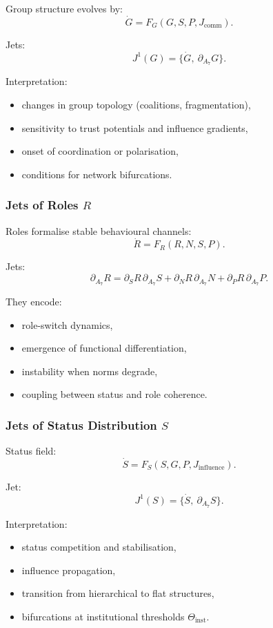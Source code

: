 Group structure evolves by:
\[
\dot{G} = F_G(G,S,P,J_{\mathrm{comm}}).
\]

Jets:
\[
J^1(G) = \{\dot{G},\ \partial_{A_7}G\}.
\]

Interpretation:
\begin{itemize}
    \item changes in group topology (coalitions, fragmentation),
    \item sensitivity to trust potentials and influence gradients,
    \item onset of coordination or polarisation,
    \item conditions for network bifurcations.
\end{itemize}


\subsubsection{Jets of Roles \texorpdfstring{$R$}{R}}

Roles formalise stable behavioural channels:
\[
\dot{R}=F_R(R,N,S,P).
\]

Jets:
\[
\partial_{A_7}R
=
\partial_{S}R\,\partial_{A_7}S
+\partial_{N}R\,\partial_{A_7}N
+\partial_{P}R\,\partial_{A_7}P.
\]

They encode:
\begin{itemize}
    \item role-switch dynamics,
    \item emergence of functional differentiation,
    \item instability when norms degrade,
    \item coupling between status and role coherence.
\end{itemize}


\subsubsection{Jets of Status Distribution \texorpdfstring{$S$}{S}}

Status field:
\[
\dot{S}=F_S(S,G,P,J_{\mathrm{influence}}).
\]

Jet:
\[
J^1(S)=\{\dot{S},\ \partial_{A_7}S\}.
\]

Interpretation:
\begin{itemize}
    \item status competition and stabilisation,
    \item influence propagation,
    \item transition from hierarchical to flat structures,
    \item bifurcations at institutional thresholds $\Theta_{\mathrm{inst}}$.
\end{itemize}


